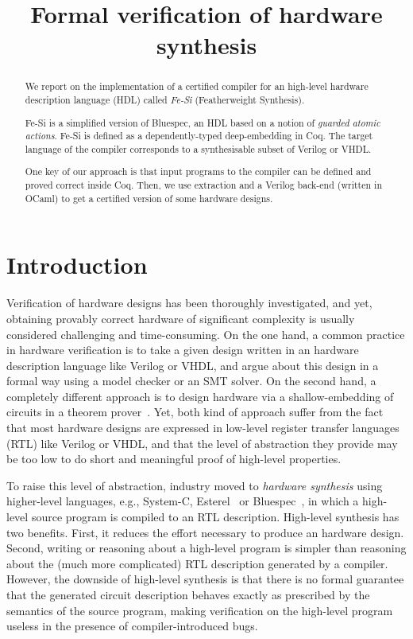 \documentclass[preprint]{sigplanconf}
\title{Formal verification of hardware synthesis}
\begin{document}
\maketitle

\begin{abstract}
  We report on the implementation of a certified compiler for an
  high-level hardware description language (HDL) called \emph{Fe-Si}
  (Featherweight Synthesis).

  Fe-Si is a simplified version of Bluespec, an HDL based on a notion
  of \emph{guarded atomic actions}. Fe-Si is defined as a
  dependently-typed deep-embedding in Coq. The target language of the
  compiler corresponds to a synthesisable subset of Verilog or VHDL.
  
  One key of our approach is that input programs to the compiler can
  be defined and proved correct inside Coq. Then, we use extraction
  and a Verilog back-end (written in OCaml) to get a certified version
  of some hardware designs.
\end{abstract}

\section*{Introduction}
Verification of hardware designs has been thoroughly investigated, and
yet, obtaining provably correct hardware of significant complexity is
usually considered challenging and time-consuming. 
%
On the one hand, a common practice in hardware verification is to take
a given design written in an hardware description language like
Verilog or VHDL, and argue about this design in a formal way using a
model checker or an SMT solver.
%
On the second hand, a completely different approach is to design
hardware via a shallow-embedding of circuits in a theorem
prover~\cite{hanna-veritas,UCAM-CL-TR-77,hunt89,vamp,certifying-circuits-in-type-theory}.
%
Yet, both kind of approach suffer from the fact that most hardware
designs are expressed in low-level register transfer languages (RTL)
like Verilog or VHDL, and that the level of abstraction they provide
may be too low to do short and meaningful proof of high-level
properties.

\medskip

To raise this level of abstraction, industry moved to \emph{hardware
  synthesis} using higher-level languages, e.g., System-C,
Esterel~\cite{DBLP:conf/birthday/Berry00} or
Bluespec~\cite{bluespec}, in which a high-level source program is
compiled to an RTL description. 
%
High-level synthesis has two benefits. 
%
First, it reduces the effort necessary to produce an hardware design.
%
Second, writing or reasoning about a high-level program is simpler
than reasoning about the (much more complicated) RTL description
generated by a compiler.
%
However, the downside of high-level synthesis is that there is no
formal guarantee that the generated circuit description behaves
exactly as prescribed by the semantics of the source
program, making verification on the high-level program useless in the
presence of compiler-introduced bugs.
%
\end{document}
